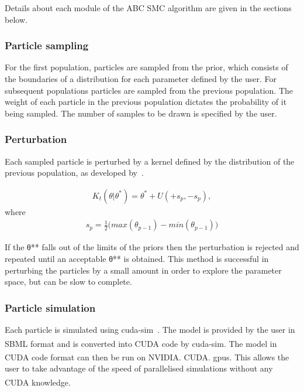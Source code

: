 \noindent Details about each module of the ABC SMC algorithm are given in the sections below. 


\subsubsection{Particle sampling}
\label{sec:part_samp}
For the first population, particles are sampled from the prior, which consists of the boundaries of a distribution for each parameter defined by the user. For subsequent populations particles are sampled from the previous population. The weight of each particle in the previous population dictates the probability of it being sampled. The number of samples to be drawn is specified by the user.  

\subsubsection{Perturbation}
\label{sec:pertub}
Each sampled particle is perturbed by a kernel defined by the distribution of the previous population, as developed by~\textcite{Toni:2009tr}. 

\begin{align}
K_t(\theta|\theta^* ) = \theta^* + U(+s_p, -s_p),
\end{align}
\noindent  where
\begin{align}
s_p = \frac{1}{2} \big (max(\theta_{p-1}) - min(\theta_{p-1}) \big )
\end{align}

\noindent If the θ** falls out of the limits of the priors then the perturbation is rejected and repeated until an acceptable θ** is obtained. This method is successful in perturbing the particles by a small amount in order to explore the parameter space, but can be slow to complete. 

\subsubsection{Particle simulation}
\label{sec:sim}
Each particle is simulated using cuda-sim~\autocite{Zhou:2011hp}. The model is provided by the user in SBML format and is converted into CUDA\textsuperscript{\textregistered} code by cuda-sim. The model in CUDA\textsuperscript{\textregistered} code format can then be run on NVIDIA\textsuperscript{\textregistered}. CUDA\textsuperscript{\textregistered}. \acrshort{gpu}s. This allows the user to take advantage of the speed of parallelised simulations without any CUDA\textsuperscript{\textregistered} knowledge. 


